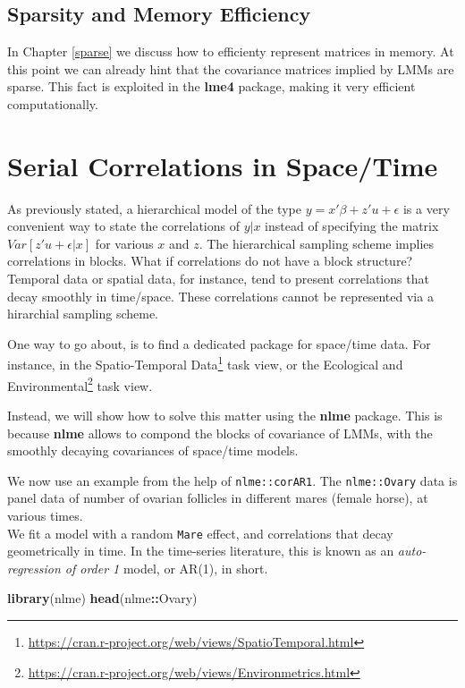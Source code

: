 \documentclass[]{book}
\newenvironment{Shaded}{\begin{snugshade}}{\end{snugshade}}
\newcommand{\KeywordTok}[1]{\textcolor[rgb]{0.13,0.29,0.53}{\textbf{#1}}}
\newcommand{\NormalTok}[1]{#1}
\newcommand{\OperatorTok}[1]{\textcolor[rgb]{0.81,0.36,0.00}{\textbf{#1}}}
\renewcommand{\href}[2]{#2\footnote{\url{#1}}}
\theoremstyle{definition}
\theoremstyle{definition}
\theoremstyle{definition}
\theoremstyle{remark}
\begin{document}
\hypertarget{sparsity-and-memory-efficiency}{%
\subsection{Sparsity and Memory Efficiency}\label{sparsity-and-memory-efficiency}}

In Chapter \ref{sparse} we discuss how to efficienty represent matrices in memory.
At this point we can already hint that the covariance matrices implied by LMMs are sparse. This fact is exploited in the \textbf{lme4} package, making it very efficient computationally.

\hypertarget{serial}{%
\section{Serial Correlations in Space/Time}\label{serial}}

As previously stated, a hierarchical model of the type \(y=x'\beta+z'u+\epsilon\) is a very convenient way to state the correlations of \(y|x\) instead of specifying the matrix \(Var[z'u+\epsilon|x]\) for various \(x\) and \(z\).
The hierarchical sampling scheme implies correlations in blocks.
What if correlations do not have a block structure?
Temporal data or spatial data, for instance, tend to present correlations that decay smoothly in time/space.
These correlations cannot be represented via a hirarchial sampling scheme.

One way to go about, is to find a dedicated package for space/time data.
For instance, in the \href{https://cran.r-project.org/web/views/SpatioTemporal.html}{Spatio-Temporal Data} task view, or the \href{https://cran.r-project.org/web/views/Environmetrics.html}{Ecological and Environmental} task view.

Instead, we will show how to solve this matter using the \textbf{nlme} package.
This is because \textbf{nlme} allows to compond the blocks of covariance of LMMs, with the smoothly decaying covariances of space/time models.

We now use an example from the help of \texttt{nlme::corAR1}.
The \texttt{nlme::Ovary} data is panel data of number of ovarian follicles in different mares (female horse), at various times.\\
We fit a model with a random \texttt{Mare} effect, and correlations that decay geometrically in time.
In the time-series literature, this is known as an \emph{auto-regression of order 1} model, or AR(1), in short.

\begin{Shaded}
\begin{Highlighting}[]
\KeywordTok{library}\NormalTok{(nlme)}
\KeywordTok{head}\NormalTok{(nlme}\OperatorTok{::}\NormalTok{Ovary)}
\end{Highlighting}
\end{Shaded}
\end{document}
